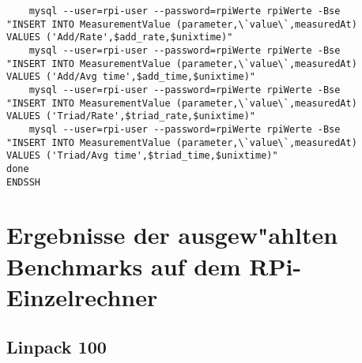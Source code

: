 \begin{verbatim}
    mysql --user=rpi-user --password=rpiWerte rpiWerte -Bse 
"INSERT INTO MeasurementValue (parameter,\`value\`,measuredAt) 
VALUES ('Add/Rate',$add_rate,$unixtime)"         
    mysql --user=rpi-user --password=rpiWerte rpiWerte -Bse 
"INSERT INTO MeasurementValue (parameter,\`value\`,measuredAt) 
VALUES ('Add/Avg time',$add_time,$unixtime)"     
    mysql --user=rpi-user --password=rpiWerte rpiWerte -Bse 
"INSERT INTO MeasurementValue (parameter,\`value\`,measuredAt) 
VALUES ('Triad/Rate',$triad_rate,$unixtime)"     
    mysql --user=rpi-user --password=rpiWerte rpiWerte -Bse 
"INSERT INTO MeasurementValue (parameter,\`value\`,measuredAt) 
VALUES ('Triad/Avg time',$triad_time,$unixtime)"
done                                                                                                                                                                        
ENDSSH
\end{verbatim}

\section{Ergebnisse der ausgew"ahlten Benchmarks auf dem RPi-Einzelrechner}\label{rpi-anhang}

\subsection{Linpack 100}\label{rpi-linpack}

